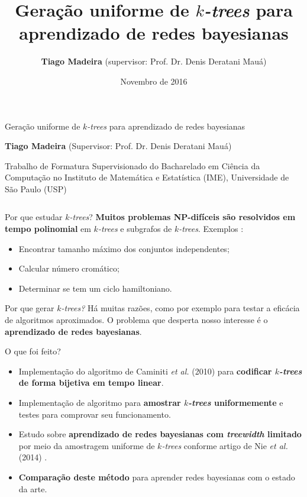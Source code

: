 \documentclass{beamer}
\title{\huge Geração uniforme de \emph{$k$-trees} para aprendizado de redes bayesianas}
\author{\textbf{Tiago Madeira} {\footnotesize (supervisor: Prof. Dr. Denis Deratani Mauá)}}
\date{Novembro de 2016}
\begin{document}
\begin{frame}
\begin{center}
  {\Huge Geração uniforme de \emph{$k$-trees} para aprendizado de redes bayesianas}

  \vspace{0.5em}

  {\large \textbf{Tiago Madeira}} {\small (Supervisor: Prof. Dr. Denis Deratani Mauá)}

  \vspace{0.3em}

  Trabalho de Formatura Supervisionado do Bacharelado em Ciência da Computação no Instituto de Matemática e Estatística (IME), Universidade de São Paulo (USP)
\end{center}

\begin{columns}[t]
\begin{column}{.5\textwidth}
  \begin{block}{Por que estudar \emph{$k$-trees}?}
    \textbf{Muitos problemas NP-difíceis são resolvidos em tempo polinomial} em \emph{$k$-trees} e subgrafos de \emph{$k$-trees}. Exemplos \cite{arnborg}:

    \begin{itemize}
      \item Encontrar tamanho máximo dos conjuntos independentes;
      \item Calcular número cromático;
      \item Determinar se tem um ciclo hamiltoniano.
    \end{itemize}
  \end{block}

  \begin{block}{Por que gerar \emph{$k$-trees?}}
    Há muitas razões, como por exemplo para testar a eficácia de algoritmos aproximados. O problema que desperta nosso interesse é o \textbf{aprendizado de redes bayesianas}.
  \end{block}

  \begin{block}{O que foi feito?}
    \begin{itemize}
      \item Implementação do algoritmo de Caminiti \emph{et al.} (2010) \cite{caminiti} para \textbf{codificar \emph{$k$-trees} de forma bijetiva em tempo linear}.
      \item Implementação de algoritmo para \textbf{amostrar \emph{$k$-trees} uniformemente} e testes para comprovar seu funcionamento.
      \item Estudo sobre \textbf{aprendizado de redes bayesianas com \emph{treewidth} limitado} por meio da amostragem uniforme de \emph{$k$-trees} conforme artigo de Nie \emph{et al.} (2014) \cite{maua}.
      \item \textbf{Comparação deste método} para aprender redes bayesianas com o estado da arte.
    \end{itemize}
  \end{block}


\end{column}
\end{columns}
\end{frame}
\end{document}
